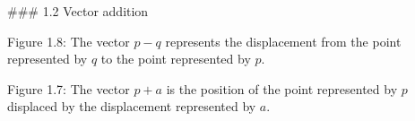 

### 1.2 Vector addition

Figure 1.8: The vector \(p-q\) represents the displacement from the point represented by \(q\) to the point represented by \(p\).

Figure 1.7: The vector \(p+a\) is the position of the point represented by \(p\) displaced by the displacement represented by \(a\).

